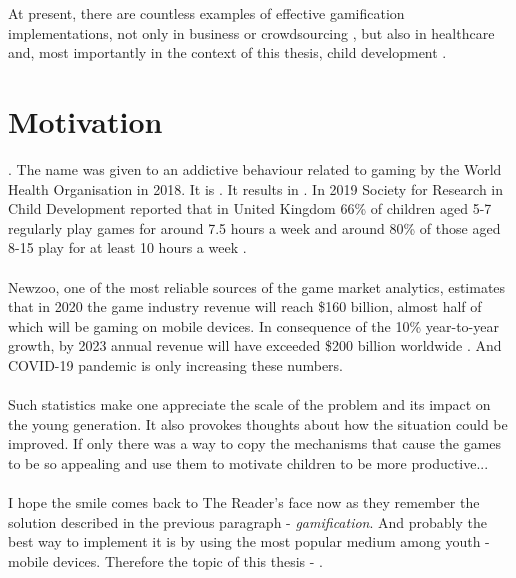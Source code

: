 \\\\
At present, there are countless examples of effective gamification implementations, not only in business \cite{hamariDoesGamificationWork2014} or crowdsourcing \cite{morschheuserGamificationCrowdsourcingReview2016}, but also in healthcare \cite{pereiraReviewGamificationHealthRelated2014} and, most importantly in the context of this thesis, child development \cite{kondracka-szalaGamesDevelopingSelected2017, nandEngagingChildrenEducational2019}.


\section{Motivation}\label{sec:introduction:motivation}
. The name was given to an addictive behaviour related to gaming by the World Health Organisation in 2018\cite{worldhealthorganisationAddictiveBehavioursGaming}. It is . It results in . In 2019 Society for Research in Child Development reported that in United Kingdom 66\% of children aged 5-7 regularly play games for around 7.5 hours a week and around 80\% of those aged 8-15 play for at least 10 hours a week \cite{hygenTimeSpentGaming2020}.
\\\\
Newzoo, one of the most reliable sources of the game market analytics, estimates that in 2020 the game industry revenue will reach \$160 billion, almost half of which will be gaming on mobile devices. In consequence of the 10\% year-to-year growth, by 2023  annual revenue will have exceeded \$200 billion worldwide \cite{tomwijmanWorldBillionGamers2020}. And COVID-19 pandemic is only increasing these numbers.
\\\\
Such statistics make one appreciate the scale of the problem and its impact on the young generation. It also provokes thoughts about how the situation could be improved. If only there was a way to copy the mechanisms that cause the games to be so appealing and use them to motivate children to be more productive...
\\\\
I hope the smile comes back to The Reader's face now as they remember the solution described in the previous paragraph - \textit{gamification}. And probably the best way to implement it is by using the most popular medium among youth - mobile devices. Therefore the topic of this thesis - . 


